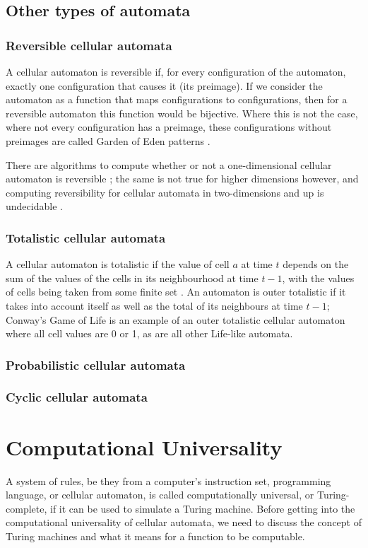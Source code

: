 \documentclass[11pt,a4paper]{article}
\begin{document}
    \subsection{Other types of automata}
    \subsubsection{Reversible cellular automata}
    A cellular automaton is reversible if, for every configuration of the
    automaton, exactly one configuration that causes it (its preimage). If we
    consider the automaton as a function that maps configurations to
    configurations, then for a reversible automaton this function would be
    bijective. Where this is not the case, where not every configuration has a
    preimage, these configurations without preimages are called Garden of Eden
    patterns \cite{GardenOfEden}.

    There are algorithms to compute whether or not a one-dimensional cellular
    automaton is reversible \cite{oneDReversible}; the same is not true for
    higher dimensions however, and computing reversibility for cellular automata
    in two-dimensions and up is undecidable \cite{twoDUndecidable}.

    \subsubsection{Totalistic cellular automata}
    A cellular automaton is totalistic if the value of cell $a$ at time $t$
    depends on the sum of the values of the cells in its neighbourhood at time
    $t-1$, with the values of cells being taken from some finite set
    \cite{totalistic}. An automaton is outer totalistic if it takes into account
    itself as well as the total of its neighbours at time $t-1$; Conway's Game
    of Life is an example of an outer totalistic cellular automaton where all
    cell values are 0 or 1, as are all other Life-like automata.

    \subsubsection{Probabilistic cellular automata}
    \subsubsection{Cyclic cellular automata}

\section{Computational Universality}
    A system of rules, be they from a computer's instruction set, programming
    language, or cellular automaton, is called computationally universal, or
    Turing-complete, if it can be used to simulate a Turing machine. Before
    getting into the computational universality of cellular automata, we need to
    discuss the concept of Turing machines and what it means for a function to
    be computable.
\end{document}
